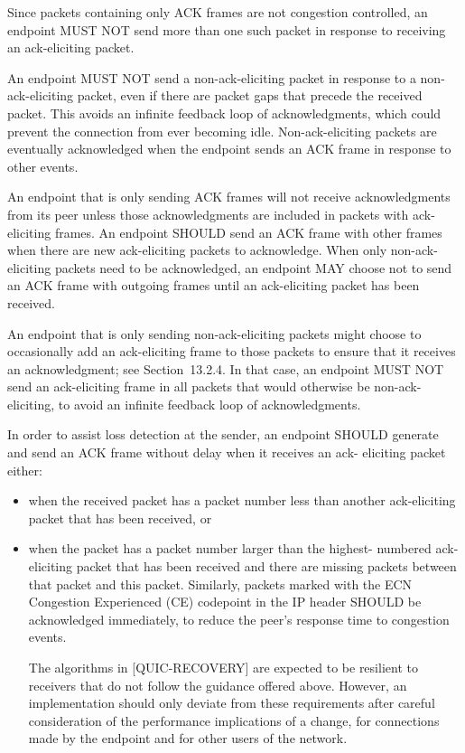 \documentclass{article}
\begin{document}
Since packets containing only ACK frames are not congestion controlled, an endpoint MUST NOT send more than one such packet in response to receiving an ack-eliciting packet.

An endpoint MUST NOT send a non-ack-eliciting packet in response to a non-ack-eliciting packet, even if there are packet gaps that precede the received packet.  This avoids an infinite feedback loop of acknowledgments, which could prevent the connection from ever becoming idle.  Non-ack-eliciting packets are eventually acknowledged when the endpoint sends an ACK frame in response to other events.

An endpoint that is only sending ACK frames will not receive acknowledgments from its peer unless those acknowledgments are included in packets with ack-eliciting frames.  An endpoint SHOULD send an ACK frame with other frames when there are new ack-eliciting packets to acknowledge.  When only non-ack-eliciting packets need to be acknowledged, an endpoint MAY choose not to send an ACK frame with outgoing frames until an ack-eliciting packet has been received.

An endpoint that is only sending non-ack-eliciting packets might choose to occasionally add an ack-eliciting frame to those packets to ensure that it receives an acknowledgment; see Section~13.2.4.  In that case, an endpoint MUST NOT send an ack-eliciting frame in all packets that would otherwise be non-ack-eliciting, to avoid an infinite feedback loop of acknowledgments.

In order to assist loss detection at the sender, an endpoint SHOULD generate and send an ACK frame without delay when it receives an ack- eliciting packet either:

\begin{itemize}
\item when the received packet has a packet number less than another ack-eliciting packet that has been received, or
\item when the packet has a packet number larger than the highest- numbered ack-eliciting packet that has been received and there are missing packets between that packet and this packet.
Similarly, packets marked with the ECN Congestion Experienced (CE) codepoint in the IP header SHOULD be acknowledged immediately, to reduce the peer's response time to congestion events.

The algorithms in [QUIC-RECOVERY] are expected to be resilient to receivers that do not follow the guidance offered above.  However, an implementation should only deviate from these requirements after careful consideration of the performance implications of a change, for connections made by the endpoint and for other users of the network.

\end{itemize}
\end{document}
